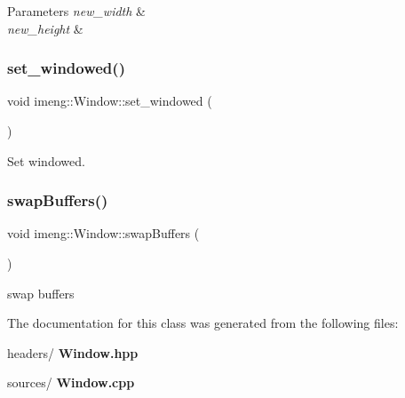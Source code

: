 \begin{DoxyParams}{Parameters}
{\em new\+\_\+width} & \\
\hline
{\em new\+\_\+height} & \\
\hline
\end{DoxyParams}
\mbox{\label{classimeng_1_1_window_a442f6083a2e4ddc1c3517d37f744d776}} 
\subsubsection{set\_windowed()}
{\footnotesize\ttfamily void imeng\+::\+Window\+::set\+\_\+windowed (\begin{DoxyParamCaption}{ }\end{DoxyParamCaption})}



Set windowed. 

\mbox{\label{classimeng_1_1_window_a4c7116c6a4817a219bfbeea1a0ff1e36}} 
\subsubsection{swapBuffers()}
{\footnotesize\ttfamily void imeng\+::\+Window\+::swap\+Buffers (\begin{DoxyParamCaption}{ }\end{DoxyParamCaption})}



swap buffers 



The documentation for this class was generated from the following files\+:\begin{DoxyCompactItemize}
\item 
headers/\textbf{ Window.\+hpp}\item 
sources/\textbf{ Window.\+cpp}\end{DoxyCompactItemize}

